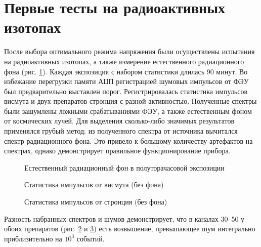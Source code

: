 \documentclass[12pt,a4paper]{report} %
\begin{document}
\section{Первые тесты на радиоактивных изотопах}
После выбора оптимального режима напряжения были осуществлены испытания на радиоактивных изотопах, а также измерение естественного радиационного фона (рис. \ref{figNoise}). Каждая экспозиция с набором статистики длилась 90 минут. Во избежание перегрузки памяти АЦП регистрацией шумовых импульсов от ФЭУ был предварительно выставлен порог. Регистрировалась статистика импульсов висмута и двух препаратов стронция с разной активностью. Полученные спектры были зашумлены ложными срабатываниями ФЭУ, а также естественным фоном от космических лучей. Для выделения сколько-либо значимых результатов применялся грубый метод: из полученного спектра от источника вычитался спектр радиационного фона. Это привело к большому количеству артефактов на спектрах, однако демонстрирует правильное функционирование прибора. 
\begin{figure}
	\noindent{}
	\caption{Естественный радиационный фон в полуторачасовой экспозиции}
	\label{figNoise}
\end{figure}
\begin{figure}
	\noindent{}
	\caption{Статистика импульсов от висмута (без фона)}
	\label{figBi90}
\end{figure}
\begin{figure}
	\noindent{}
	\caption{Статистика импульсов от стронция (без фона)}
	\label{figSTR90}
\end{figure}
Разность набранных спектров и шумов демонстрирует, что в каналах 30--50 у обоих препаратов (рис. \ref{figBi90} и \ref{figSTR90}) есть возвышение, превышающее шум интегрально приблизительно на $10^3$ событий.
\end{document}
